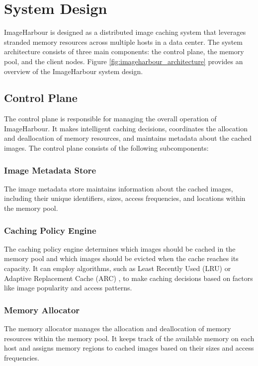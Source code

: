 \section{System Design}\label{sec:system_design}
ImageHarbour is designed as a distributed image caching system that leverages stranded memory resources across multiple hosts in a data center. The system architecture consists of three main components: the control plane, the memory pool, and the client nodes. Figure \ref{fig:imageharbour_architecture} provides an overview of the ImageHarbour system design.

\subsection{Control Plane}
The control plane is responsible for managing the overall operation of ImageHarbour. It makes intelligent caching decisions, coordinates the allocation and deallocation of memory resources, and maintains metadata about the cached images. The control plane consists of the following subcomponents:

\subsubsection{Image Metadata Store}
The image metadata store maintains information about the cached images, including their unique identifiers, sizes, access frequencies, and locations within the memory pool.

\subsubsection{Caching Policy Engine}
The caching policy engine determines which images should be cached in the memory pool and which images should be evicted when the cache reaches its capacity. It can employ algorithms, such as Least Recently Used (LRU) or Adaptive Replacement Cache (ARC) \cite{megiddo2003arc}, to make caching decisions based on factors like image popularity and access patterns.

\subsubsection{Memory Allocator}
The memory allocator manages the allocation and deallocation of memory resources within the memory pool. It keeps track of the available memory on each host and assigns memory regions to cached images based on their sizes and access frequencies.

